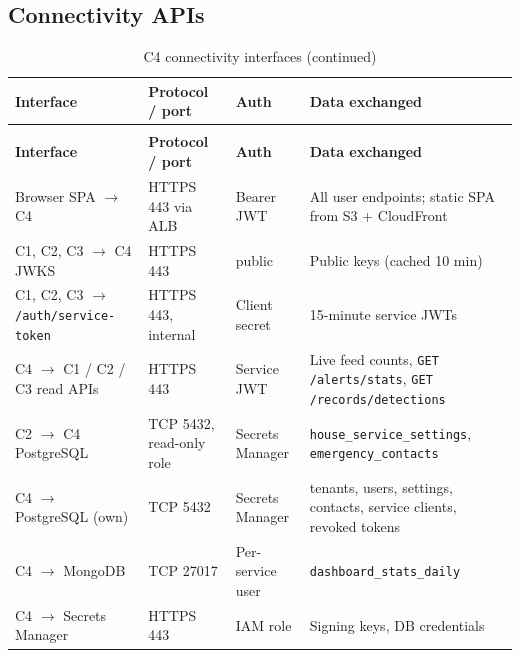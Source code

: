 \subsection{Connectivity APIs}
\begin{longtable}{L{3.4cm}L{2.6cm}L{2.2cm}L{6.4cm}}
\caption{C4 connectivity interfaces}\label{tab:c4-conn}\\
\toprule
\textbf{Interface} & \textbf{Protocol / port} & \textbf{Auth} & \textbf{Data exchanged} \\
\midrule
\endfirsthead
\caption[]{C4 connectivity interfaces (continued)}\\
\toprule
\textbf{Interface} & \textbf{Protocol / port} & \textbf{Auth} & \textbf{Data exchanged} \\
\midrule
\endhead
Browser SPA $\rightarrow$ C4 & HTTPS 443 via ALB & Bearer JWT & All user endpoints; static SPA from S3 + CloudFront \\
C1, C2, C3 $\rightarrow$ C4 JWKS & HTTPS 443 & public & Public keys (cached 10 min) \\
C1, C2, C3 $\rightarrow$ \texttt{/auth/service-token} & HTTPS 443, internal & Client secret & 15-minute service JWTs \\
C4 $\rightarrow$ C1 / C2 / C3 read APIs & HTTPS 443 & Service JWT & Live feed counts, \texttt{GET /alerts/stats}, \texttt{GET /records/detections} \\
C2 $\rightarrow$ C4 PostgreSQL & TCP 5432, read-only role & Secrets Manager & \texttt{house\_service\_settings}, \texttt{emergency\_contacts} \\
C4 $\rightarrow$ PostgreSQL (own) & TCP 5432 & Secrets Manager & tenants, users, settings, contacts, service clients, revoked tokens \\
C4 $\rightarrow$ MongoDB & TCP 27017 & Per-service user & \texttt{dashboard\_stats\_daily} \\
C4 $\rightarrow$ Secrets Manager & HTTPS 443 & IAM role & Signing keys, DB credentials \\
\bottomrule
\end{longtable}

